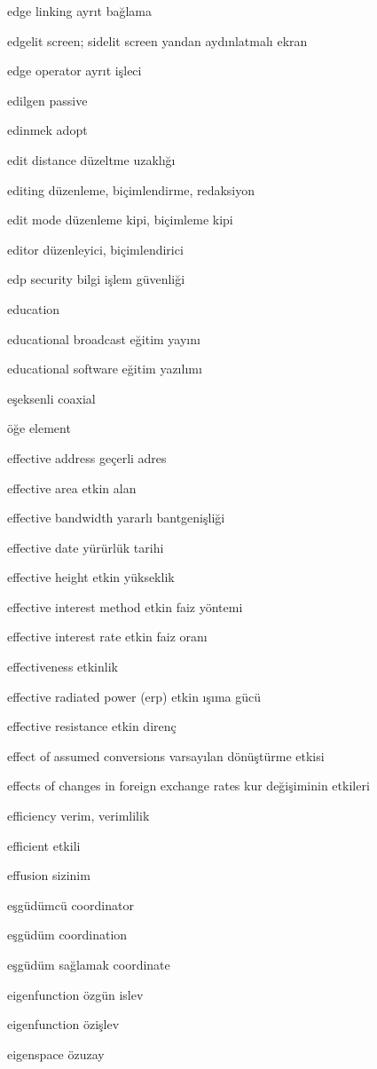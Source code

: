 \documentclass[12pt,fleqn]{article}\usepackage{../../common}
\begin{document}
edge linking ayrıt bağlama

edgelit screen; sidelit screen yandan aydınlatmalı ekran

edge operator ayrıt işleci

edilgen passive

edinmek adopt

edit distance düzeltme uzaklığı

editing düzenleme, biçimlendirme, redaksiyon

edit mode düzenleme kipi, biçimleme kipi

editor düzenleyici, biçimlendirici

edp security bilgi işlem güvenliği

education

educational broadcast eğitim yayını

educational software eğitim yazılımı

eşeksenli coaxial

öğe element

effective address geçerli adres

effective area etkin alan

effective bandwidth yararlı bantgenişliği

effective date yürürlük tarihi

effective height etkin yükseklik

effective interest method etkin faiz yöntemi

effective interest rate etkin faiz oranı

effectiveness etkinlik

effective radiated power (erp) etkin ışıma gücü

effective resistance etkin direnç

effect of assumed conversions varsayılan dönüştürme etkisi

effects of changes in foreign exchange rates kur değişiminin etkileri

efficiency verim, verimlilik

efficient etkili

effusion sizinim

eşgüdümcü coordinator

eşgüdüm coordination

eşgüdüm sağlamak coordinate

eigenfunction özgün islev

eigenfunction özişlev

eigenspace özuzay
\end{document}
